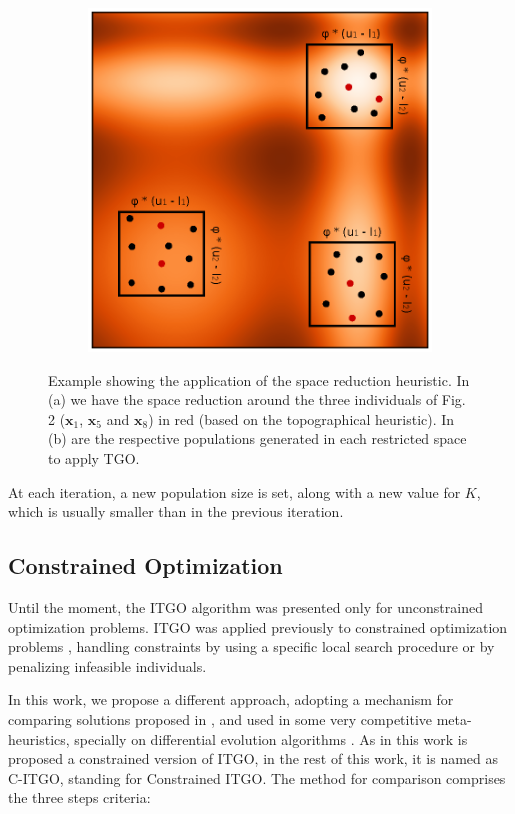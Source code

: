\begin{figure}[tp]
\begin{subfigure}{.5\textwidth}
  \includegraphics[width=1.1\linewidth]{fig_3.eps}
  \caption{}
  \label{fig:SpaceReduction-b}
\end{subfigure}
\caption{Example showing the application of the space reduction heuristic. In (a) we have the space reduction around the three individuals of Fig. 2 ($\bm{x}_1$, $\bm{x}_5$ and $\bm{x}_8$) in red (based on the topographical heuristic). In (b) are the respective populations generated in each restricted space to apply TGO.}\label{fig:SpaceReduction}
\end{figure}


At each iteration, a new population size is set, along with a new value for $K$, which is usually smaller than in the previous iteration.


\subsection{Constrained Optimization}

Until the moment, the ITGO algorithm was presented only for unconstrained optimization problems. ITGO was applied previously to constrained optimization problems \citep{ITGO2, ITGO3}, handling constraints by using a specific local search procedure or by penalizing infeasible individuals.

In this work, we propose a different approach, adopting a mechanism for comparing solutions proposed in \cite{ConHandling}, and used in some very competitive meta-heuristics, specially on differential evolution algorithms \citep{DE1, DE2, DE3}. As in this work is proposed a constrained version of ITGO, in the rest of this work, it is named as C-ITGO, standing for Constrained ITGO. The method for comparison comprises the three steps criteria:

